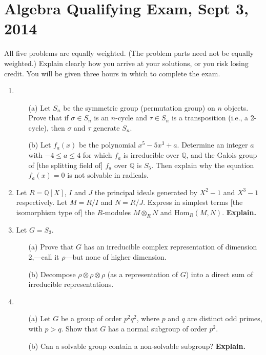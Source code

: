 \documentclass{article}
\begin{document}
\section*{Algebra Qualifying Exam, Sept 3, 2014}

All five problems are equally weighted. (The problem parts need not be equally weighted.) Explain clearly how you arrive at your solutions, or you risk losing credit. You will be given three hours in which to complete the exam.

\begin{enumerate}
    \item 
    \begin{itemize}
        \item[(a)] Let \(S_n\) be the symmetric group (permutation group) on \(n\) objects. Prove that if \(\sigma \in S_n\) is an \(n\)-cycle and \(\tau \in S_n\) is a transposition (i.e., a 2-cycle), then \(\sigma\) and \(\tau\) generate \(S_n\).
        \item[(b)] Let \(f_a(x)\) be the polynomial \(x^5 - 5x^3 + a\). Determine an integer \(a\) with \(-4 \leq a \leq 4\) for which \(f_a\) is irreducible over \(\mathbb{Q}\), and the Galois group of [the splitting field of] \(f_a\) over \(\mathbb{Q}\) is \(S_5\). Then explain why the equation \(f_a(x) = 0\) is not solvable in radicals.
    \end{itemize}

    \item Let \(R = \mathbb{Q}[X]\), \(I\) and \(J\) the principal ideals generated by \(X^2 - 1\) and \(X^3 - 1\) respectively. Let \(M = R/I\) and \(N = R/J\). Express in simplest terms [the isomorphism type of] the \(R\)-modules \(M \otimes_R N\) and \(\text{Hom}_R(M, N)\). \textbf{Explain.}

    \item Let \(G = S_3\).
    \begin{itemize}
        \item[(a)] Prove that \(G\) has an irreducible complex representation of dimension 2,—call it \(\rho\)—but none of higher dimension.
        \item[(b)] Decompose \(\rho \otimes \rho \otimes \rho\) (as a representation of \(G\)) into a direct sum of irreducible representations.
    \end{itemize}

    \item 
    \begin{itemize}
        \item[(a)] Let \(G\) be a group of order \(p^2q^2\), where \(p\) and \(q\) are distinct odd primes, with \(p > q\). Show that \(G\) has a normal subgroup of order \(p^2\).
        \item[(b)] Can a solvable group contain a non-solvable subgroup? \textbf{Explain.}
    \end{itemize}


\end{enumerate}
\end{document}
